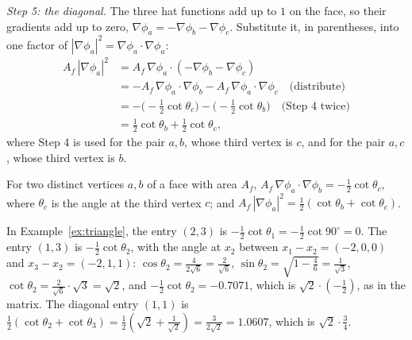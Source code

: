 \emph{Step 5: the diagonal.} The three hat functions add up to $1$ on the face, so their gradients add up to zero, $\nabla \phi_a = -\nabla \phi_b - \nabla \phi_c$. Substitute it, in parentheses, into one factor of $|\nabla\phi_a|^2 = \nabla\phi_a\cdot\nabla\phi_a$:
\begin{align*}
A_f\, |\nabla\phi_a|^2 &= A_f\, \nabla\phi_a \cdot (-\nabla\phi_b - \nabla\phi_c) \\
&= -A_f\, \nabla\phi_a\cdot\nabla\phi_b - A_f\, \nabla\phi_a\cdot\nabla\phi_c \quad \text{(distribute)}\\
&= -\big(-\tfrac12\cot\theta_c\big) - \big(-\tfrac12\cot\theta_b\big) \quad \text{(Step 4 twice)}\\
&= \tfrac12\cot\theta_b + \tfrac12\cot\theta_c ,
\end{align*}
where Step 4 is used for the pair $a, b$, whose third vertex is $c$, and for the pair $a, c$, whose third vertex is $b$.
\begin{prop}
\label{prop:cotangent}
For two distinct vertices $a, b$ of a face with area $A_f$, $A_f\, \nabla \phi_a \cdot \nabla \phi_b = -\frac12 \cot \theta_c$, where $\theta_c$ is the angle at the third vertex $c$; and $A_f\, |\nabla \phi_a|^2 = \frac12 (\cot \theta_b + \cot \theta_c)$.
\end{prop}
In Example~\ref{ex:triangle}, the entry $(2, 3)$ is $-\frac12\cot\theta_1 = -\frac12\cot 90^\circ = 0$. The entry $(1, 3)$ is $-\frac12\cot\theta_2$, with the angle at $x_2$ between $x_1 - x_2 = (-2, 0, 0)$ and $x_3 - x_2 = (-2, 1, 1)$: $\cos\theta_2 = \frac{4}{2\sqrt 6} = \frac{2}{\sqrt 6}$, $\sin\theta_2 = \sqrt{1 - \frac46} = \frac{1}{\sqrt 3}$, $\cot\theta_2 = \frac{2}{\sqrt 6}\cdot\sqrt 3 = \sqrt 2$, and $-\frac12\cot\theta_2 = -0.7071$, which is $\sqrt 2\cdot(-\frac12)$, as in the matrix. The diagonal entry $(1, 1)$ is $\frac12(\cot\theta_2 + \cot\theta_3) = \frac12(\sqrt 2 + \frac{1}{\sqrt 2}) = \frac{3}{2\sqrt 2} = 1.0607$, which is $\sqrt 2\cdot\frac34$.

